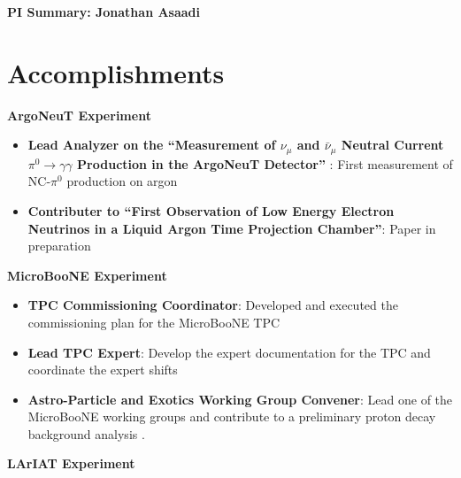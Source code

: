 
\begin{center}
\LARGE\textbf{PI Summary: Jonathan Asaadi}
\end{center}

\section*{\textbf{Accomplishments}}

\noindent\textbf{ArgoNeuT Experiment}
\begin{itemize}[noitemsep,nolistsep]
\item{\textbf{Lead Analyzer on the ``Measurement of $\nu_{\mu}$ and $\bar{\nu}_{\mu}$ Neutral Current $\pi^{0} \rightarrow \gamma\gamma$ Production in the ArgoNeuT Detector''}} : First measurement of NC-$\pi^{0}$ production on argon

\item{\textbf{Contributer to ``First Observation of Low Energy Electron Neutrinos in a Liquid Argon Time Projection Chamber''}}: Paper in preparation

\end{itemize}

\noindent\textbf{MicroBooNE Experiment}
\begin{itemize}[noitemsep,nolistsep]
\item{\textbf{TPC Commissioning Coordinator}}: Developed and executed the commissioning plan for the MicroBooNE TPC

\item{\textbf{Lead TPC Expert}}: Develop the expert documentation for the TPC and coordinate the expert shifts

\item{\textbf{Astro-Particle and Exotics Working Group Convener}}: Lead one of the MicroBooNE working groups and contribute to a preliminary proton decay background analysis \cite{}.

\end{itemize}

\noindent\textbf{LArIAT Experiment}

